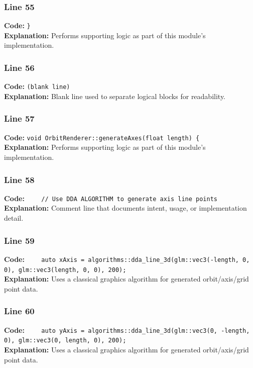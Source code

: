 \documentclass[11pt,a4paper]{article}
\begin{document}
\subsubsection*{Line 55}
\textbf{Code:} \verb|}|\\
\textbf{Explanation:} Performs supporting logic as part of this module's implementation.

\subsubsection*{Line 56}
\textbf{Code:} \texttt{(blank line)}\\
\textbf{Explanation:} Blank line used to separate logical blocks for readability.

\subsubsection*{Line 57}
\textbf{Code:} \verb|void OrbitRenderer::generateAxes(float length) {|\\
\textbf{Explanation:} Performs supporting logic as part of this module's implementation.

\subsubsection*{Line 58}
\textbf{Code:} \verb|    // Use DDA ALGORITHM to generate axis line points|\\
\textbf{Explanation:} Comment line that documents intent, usage, or implementation detail.

\subsubsection*{Line 59}
\textbf{Code:} \verb|    auto xAxis = algorithms::dda_line_3d(glm::vec3(-length, 0, 0), glm::vec3(length, 0, 0), 200);|\\
\textbf{Explanation:} Uses a classical graphics algorithm for generated orbit/axis/grid point data.

\subsubsection*{Line 60}
\textbf{Code:} \verb|    auto yAxis = algorithms::dda_line_3d(glm::vec3(0, -length, 0), glm::vec3(0, length, 0), 200);|\\
\textbf{Explanation:} Uses a classical graphics algorithm for generated orbit/axis/grid point data.
\end{document}
